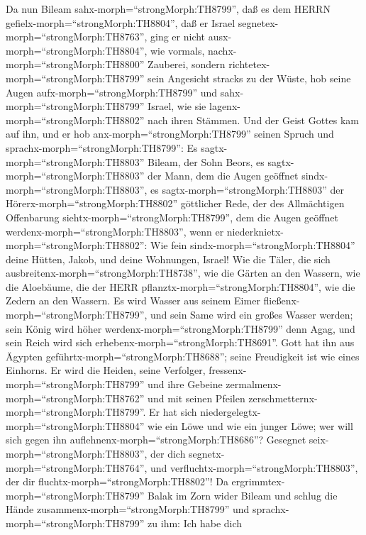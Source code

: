  Da nun Bileam sahx-morph=``strongMorph:TH8799'', daß es dem
HERRN gefielx-morph=``strongMorph:TH8804'', daß er Israel
segnetex-morph=``strongMorph:TH8763'', ging er nicht
ausx-morph=``strongMorph:TH8804'', wie vormals,
nachx-morph=``strongMorph:TH8800'' Zauberei, sondern
richtetex-morph=``strongMorph:TH8799'' sein Angesicht stracks zu der
Wüste,  hob seine Augen aufx-morph=``strongMorph:TH8799''
und sahx-morph=``strongMorph:TH8799'' Israel, wie sie
lagenx-morph=``strongMorph:TH8802'' nach ihren Stämmen. Und der Geist
Gottes kam auf ihn,  und er hob
anx-morph=``strongMorph:TH8799'' seinen Spruch und
sprachx-morph=``strongMorph:TH8799'': Es
sagtx-morph=``strongMorph:TH8803'' Bileam, der Sohn Beors, es
sagtx-morph=``strongMorph:TH8803'' der Mann, dem die Augen geöffnet
sindx-morph=``strongMorph:TH8803'',  es
sagtx-morph=``strongMorph:TH8803'' der
Hörerx-morph=``strongMorph:TH8802'' göttlicher Rede, der des
Allmächtigen Offenbarung siehtx-morph=``strongMorph:TH8799'', dem die
Augen geöffnet werdenx-morph=``strongMorph:TH8803'', wenn er
niederknietx-morph=``strongMorph:TH8802'':  Wie fein
sindx-morph=``strongMorph:TH8804'' deine Hütten, Jakob, und deine
Wohnungen, Israel!  Wie die Täler, die sich
ausbreitenx-morph=``strongMorph:TH8738'', wie die Gärten an den Wassern,
wie die Aloebäume, die der HERR pflanztx-morph=``strongMorph:TH8804'',
wie die Zedern an den Wassern.  Es wird Wasser aus seinem
Eimer fließenx-morph=``strongMorph:TH8799'', und sein Same wird ein
großes Wasser werden; sein König wird höher
werdenx-morph=``strongMorph:TH8799'' denn Agag, und sein Reich wird sich
erhebenx-morph=``strongMorph:TH8691''.  Gott hat ihn aus
Ägypten geführtx-morph=``strongMorph:TH8688''; seine Freudigkeit ist wie
eines Einhorns. Er wird die Heiden, seine Verfolger,
fressenx-morph=``strongMorph:TH8799'' und ihre Gebeine
zermalmenx-morph=``strongMorph:TH8762'' und mit seinen Pfeilen
zerschmetternx-morph=``strongMorph:TH8799''.  Er hat sich
niedergelegtx-morph=``strongMorph:TH8804'' wie ein Löwe und wie ein
junger Löwe; wer will sich gegen ihn
auflehnenx-morph=``strongMorph:TH8686''? Gesegnet
seix-morph=``strongMorph:TH8803'', der dich
segnetx-morph=``strongMorph:TH8764'', und
verfluchtx-morph=``strongMorph:TH8803'', der dir
fluchtx-morph=``strongMorph:TH8802''!  Da
ergrimmtex-morph=``strongMorph:TH8799'' Balak im Zorn wider Bileam und
schlug die Hände zusammenx-morph=``strongMorph:TH8799'' und
sprachx-morph=``strongMorph:TH8799'' zu ihm: Ich habe dich
